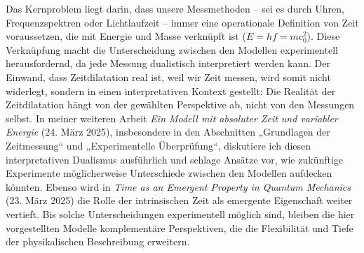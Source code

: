 \documentclass[a4paper,12pt]{article}
\begin{document}
	Das Kernproblem liegt darin, dass unsere Messmethoden – sei es durch Uhren, Frequenzspektren oder Lichtlaufzeit – immer eine operationale Definition von Zeit voraussetzen, die mit Energie und Masse verknüpft ist (\( E = h f = m c_0^2 \)). Diese Verknüpfung macht die Unterscheidung zwischen den Modellen experimentell herausfordernd, da jede Messung dualistisch interpretiert werden kann. Der Einwand, dass Zeitdilatation real ist, weil wir Zeit messen, wird somit nicht widerlegt, sondern in einen interpretativen Kontext gestellt: Die Realität der Zeitdilatation hängt von der gewählten Perspektive ab, nicht von den Messungen selbst. In meiner weiteren Arbeit \textit{Ein Modell mit absoluter Zeit und variabler Energie} (24. März 2025), insbesondere in den Abschnitten „Grundlagen der Zeitmessung“ und „Experimentelle Überprüfung“, diskutiere ich diesen interpretativen Dualismus ausführlich und schlage Ansätze vor, wie zukünftige Experimente möglicherweise Unterschiede zwischen den Modellen aufdecken könnten. Ebenso wird in \textit{Time as an Emergent Property in Quantum Mechanics} (23. März 2025) die Rolle der intrinsischen Zeit als emergente Eigenschaft weiter vertieft. Bis solche Unterscheidungen experimentell möglich sind, bleiben die hier vorgestellten Modelle komplementäre Perspektiven, die die Flexibilität und Tiefe der physikalischen Beschreibung erweitern.
	
\end{document}

